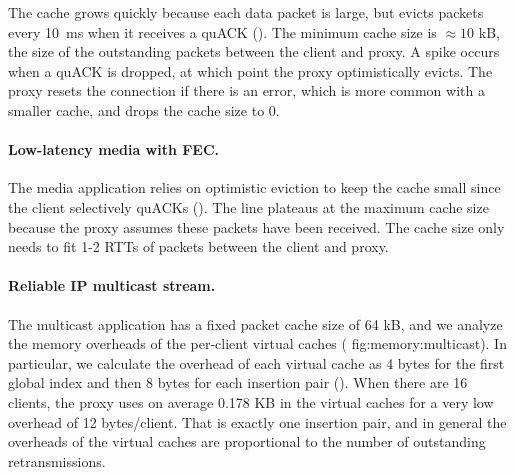 The cache grows quickly because each data packet is large, but evicts
packets every 10~ms when
it receives a quACK (). The minimum cache size is
$\approx\!10$ kB, the size of the outstanding packets between the client and
proxy. A spike occurs when a quACK is dropped, at which point the proxy
optimistically evicts. The proxy resets the connection if there is an
error, which is more common with a smaller cache, and drops the cache
size to 0.

\paragraph{Low-latency media with FEC.}

The media application relies on optimistic eviction to keep the cache small
since the client selectively quACKs (). The
line plateaus at the maximum cache size because the proxy
assumes these packets have been received. The cache size only needs to fit 1-2
RTTs of packets between the client and proxy.

\paragraph{Reliable IP multicast stream.}

The multicast application has a fixed packet cache size of 64 kB, and we analyze
the memory overheads of the per-client virtual caches (\Cref
{fig:memory:multicast}). In particular, we calculate the overhead of each
virtual cache as 4 bytes for the first global index and then 8 bytes for each
insertion pair (). When there are 16 clients,
the proxy uses on average 0.178 KB in the virtual caches for a very low
overhead of 12 bytes/client. That is exactly one insertion pair, and in general
the overheads of the virtual caches are proportional to the number of
outstanding retransmissions.
